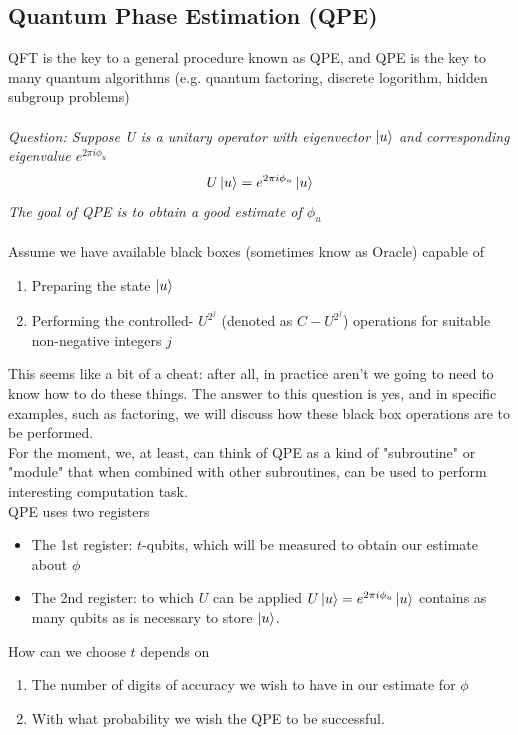 \documentclass[]{book}
\theoremstyle{nonumberplain}
\begin{document}
\subsection{Quantum Phase Estimation (QPE)}
QFT is the key to a general procedure known as QPE, and QPE is the key to many quantum algorithms (e.g. quantum factoring, discrete logorithm, hidden subgroup problems) \\
\\
\textit{Question: Suppose U is a unitary operator with eigenvector $\ket{u}$ and corresponding eigenvalue $e^{2\pi i \phi_{u}}$}
\[
U\ket{u}=e^{2\pi i \phi_{u}}\ket{u}
\] 
\textit{The goal of QPE is to obtain a good estimate of $\phi_{u}$}\\
\\
Assume we have available black boxes (sometimes know as Oracle) capable of 
\begin{enumerate}
	\item Preparing the state $\ket{u}$ 
	\item Performing the controlled- $U^{2^{j}}$ (denoted as $C-U^{2^{j}}$) operations for suitable non-negative integers $j$
\end{enumerate}
This seems like a bit of a cheat: after all, in practice aren't we going to need to know how to do these things. The answer to this question is yes, and in specific examples, such as factoring, we will discuss how these black box operations are to be performed.\\
For the moment, we, at least, can think of QPE as a kind of "subroutine" or "module" that when combined with other subroutines, can be used to perform interesting computation task.
\\
QPE uses two registers
\begin{itemize}
	\item The 1st register: $t$-qubits, which will be measured to obtain our estimate about $\phi$
	\item The 2nd register: to which $U$ can be applied $U\ket{u}=e^{2\pi i \phi_{u}}\ket{u}$ contains as many qubits as is necessary to store $\ket{u}$.
\end{itemize}
How can we choose $t$ depends on 
\begin{enumerate}
	\item The number of digits of accuracy we wish to have in our estimate for $\phi$ 
	\item With what probability we wish the QPE to be successful.
\end{enumerate}
\end{document}
